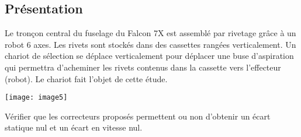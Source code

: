 \begin{multicols}{2}
\setcounter{numques}{0}
\subsection*{Présentation}
Le tronçon central du fuselage du Falcon 7X est assemblé par rivetage grâce à un robot 6 axes. Les rivets sont stockés dans des cassettes rangées verticalement. Un chariot de sélection se déplace verticalement pour déplacer une buse d'aspiration qui permettra d'acheminer les rivets contenus dans la cassette vers l'effecteur (robot). Le chariot fait l'objet de cette étude.

\begin{center}
\texttt{[image: image5]}
\end{center} 

\begin{obj}
Vérifier que les correcteurs proposés permettent ou non d'obtenir un écart statique nul et un écart en vitesse nul.
\end{obj}
% 

%




% 
% 
%
%
%
%
%


\end{multicols}
